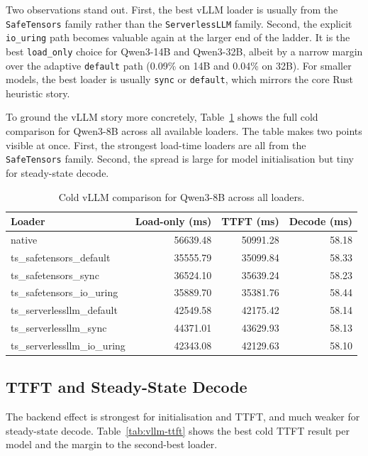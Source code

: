 Two observations stand out. First, the best vLLM loader is usually from the \texttt{SafeTensors} family rather than the \texttt{ServerlessLLM} family. Second, the explicit \texttt{io\_uring} path becomes valuable again at the larger end of the ladder. It is the best \texttt{load\_only} choice for Qwen3-14B and Qwen3-32B, albeit by a narrow margin over the adaptive \texttt{default} path (0.09\% on 14B and 0.04\% on 32B). For smaller models, the best loader is usually \texttt{sync} or \texttt{default}, which mirrors the core Rust heuristic story.

To ground the vLLM story more concretely, Table~\ref{tab:vllm-qwen8b-all} shows the full cold comparison for Qwen3-8B across all available loaders. The table makes two points visible at once. First, the strongest load-time loaders are all from the \texttt{SafeTensors} family. Second, the spread is large for model initialisation but tiny for steady-state decode.

\begin{table}[h]
\caption{Cold vLLM comparison for Qwen3-8B across all loaders.}
\label{tab:vllm-qwen8b-all}
\centering
\begin{tabular}{lrrr}
\toprule
Loader & Load-only (ms) & TTFT (ms) & Decode (ms) \\
\midrule
native & 56639.48 & 50991.28 & 58.18 \\
ts\_safetensors\_default & 35555.79 & 35099.84 & 58.33 \\
ts\_safetensors\_sync & 36524.10 & 35639.24 & 58.23 \\
ts\_safetensors\_io\_uring & 35889.70 & 35381.76 & 58.44 \\
ts\_serverlessllm\_default & 42549.58 & 42175.42 & 58.14 \\
ts\_serverlessllm\_sync & 44371.01 & 43629.93 & 58.13 \\
ts\_serverlessllm\_io\_uring & 42343.08 & 42129.63 & 58.10 \\
\bottomrule
\end{tabular}
\end{table}

\subsection{TTFT and Steady-State Decode}

The backend effect is strongest for initialisation and TTFT, and much weaker for steady-state decode. Table~\ref{tab:vllm-ttft} shows the best cold TTFT result per model and the margin to the second-best loader.

